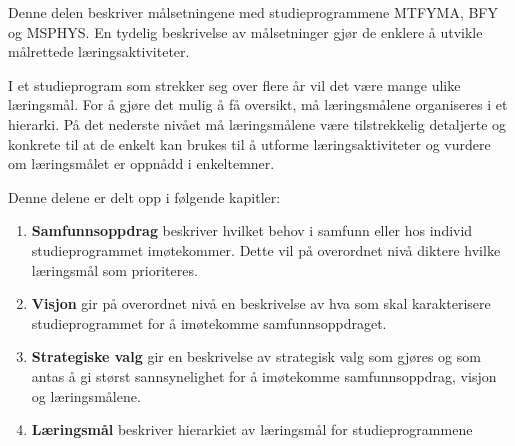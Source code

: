Denne delen beskriver målsetningene med studieprogrammene MTFYMA, BFY og MSPHYS. 
En tydelig beskrivelse av målsetninger gjør de enklere å utvikle målrettede læringsaktiviteter.

I et studieprogram som strekker seg over flere år vil det være mange ulike læringsmål. For å gjøre det mulig å få oversikt, må læringsmålene organiseres i et hierarki. 
På det nederste nivået må læringsmålene være tilstrekkelig detaljerte og konkrete til at de enkelt kan brukes til å utforme læringsaktiviteter og vurdere om læringsmålet er oppnådd i enkeltemner.

Denne delene er delt opp i følgende kapitler:

\begin{enumerate}
	\item \textbf{Samfunnsoppdrag} beskriver hvilket behov i samfunn eller hos individ studieprogrammet imøtekommer. Dette vil på overordnet nivå diktere hvilke læringsmål som prioriteres.
	\item \textbf{Visjon} gir på overordnet nivå en beskrivelse av hva som skal karakterisere studieprogrammet for å imøtekomme samfunnsoppdraget.
	\item \textbf{Strategiske valg} gir en beskrivelse av strategisk valg som gjøres og som antas å gi størst sannsynelighet for å imøtekomme samfunnsoppdrag, visjon og læringsmålene.
	\item \textbf{Læringsmål} beskriver hierarkiet av læringsmål for studieprogrammene
\end{enumerate}
